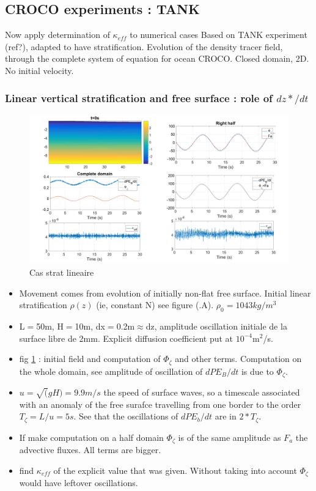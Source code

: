 \subsection{CROCO experiments : TANK}

Now apply determination of $\kappa_{eff}$ to numerical cases Based on TANK experiment (ref?), adapted to have stratification. Evolution of the density tracer field, through the complete system of equation for ocean CROCO. Closed domain, 2D. No initial velocity. 

\subsubsection{Linear vertical stratification and free surface : role of $dz*/dt$}

\begin{figure}[h!]
\centering
\includegraphics[width=1\textwidth]{./CHAP_BPE/Fig_TANK_linS.png}
\caption{Cas strat lineaire}
\label{figClin}
\end{figure}

\begin{itemize}
\item Movement comes from evolution of initially non-flat free surface. Initial linear stratification $\rho(z)$ (ie, constant N) see figure (.A). $\rho_0=1043 kg/m^3$
\item L$=$50m, H$=$10m, dx$=$0.2m$\approx$dz, amplitude oscillation initiale de la surface libre de 2mm. Explicit diffusion coefficient put at $10^{-4}$m$^2$/s. 
\item fig \ref{figClin} : initial field and computation of $\Phi_{\zeta}$ and other terms. Computation on the whole domain, see amplitude of oscillation of $dPE_B/dt$ is due to $\Phi_{\zeta}$.
\item $u=\sqrt(gH)=9.9 m/s$ the speed of surface waves, so a timescale associated with an anomaly of the free surafce travelling from one border to the order $T_{\zeta}=L/u=5s$. See that the oscillations of $dPE_b/dt$ are in $2*T_{\zeta}$.
\item If make computation on a half domain $\Phi_{\zeta}$ is of the same amplitude as $F_a$ the advective fluxes. All terms are bigger.
\item find $\kappa_{eff}$ of the explicit value that was given. Without taking into account $\Phi_{\zeta}$ would have leftover oscillations.
\end{itemize}

